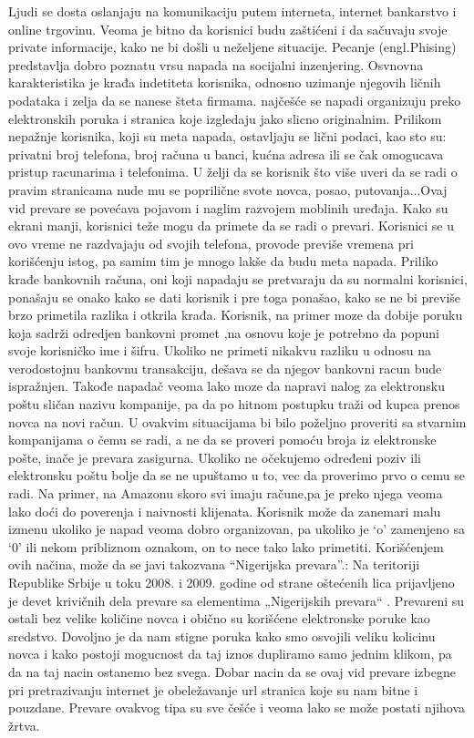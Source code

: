\documentclass[a4paper]{article}
\begin{document}
Ljudi se dosta oslanjaju na komunikaciju putem interneta, internet bankarstvo i	online trgovinu. Veoma je bitno da korisnici budu zaštićeni i da sačuvaju svoje private informacije, kako ne bi došli u neželjene situacije. Pecanje (engl.Phising) predstavlja dobro poznatu vrsu napada na socijalni inzenjering. Osvnovna karakteristika je krađa indetiteta korisnika, odnosno uzimanje njegovih ličnih podataka i zelja da se nanese šteta firmama. najčešće se napadi organizuju preko elektronskih poruka i stranica koje izgledaju jako slicno originalnim. Prilikom nepažnje korisnika, koji su meta napada, ostavljaju se lični podaci, kao sto su:  privatni broj telefona, broj računa u banci, kućna adresa ili se čak  omogucava pristup racunarima i telefonima. U želji da se korisnik što više uveri da se radi o pravim stranicama nude mu se poprilične svote novca, posao, putovanja...Ovaj vid prevare se povećava pojavom i naglim razvojem moblinih uređaja. Kako su ekrani manji, korisnici teže mogu da primete da se radi o prevari. Korisnici se u ovo vreme ne razdvajaju od svojih telefona, provode previše vremena pri korišćenju istog, pa samim tim je mnogo lakše da budu meta napada. Priliko krađe bankovnih računa, oni koji napadaju se pretvaraju da su normalni korisnici, ponašaju se onako kako se dati korisnik i pre toga ponašao, kako se ne bi previše brzo primetila razlika i otkrila krađa. 
Korisnik, na primer moze da dobije poruku  koja sadrži odredjen bankovni promet ,na osnovu koje je potrebno da popuni svoje korisničko ime i šifru. Ukoliko ne primeti nikakvu razliku u odnosu na verodostojnu bankovnu transakciju, dešava se da njegov bankovni racun bude ispražnjen. Takođe napadač veoma lako moze da napravi nalog za elektronsku poštu sličan nazivu kompanije, pa da po hitnom postupku traži od kupca prenos novca na novi račun. U ovakvim situacijama bi bilo poželjno proveriti sa stvarnim kompanijama o čemu se radi, a ne da se proveri pomoću broja iz elektronske pošte, inače je prevara zasigurna. Ukoliko ne očekujemo određeni poziv ili elektronsku poštu bolje da se ne upuštamo u to, vec da proverimo prvo o cemu se radi.
Na primer, na Amazonu skoro svi imaju račune,pa je preko njega veoma lako doći do poverenja i naivnosti klijenata. Korisnik može da zanemari malu izmenu ukoliko je napad veoma dobro organizovan, pa ukoliko je ‘o’ zamenjeno sa ‘0’  ili nekom pribliznom oznakom, on to nece tako lako primetiti. \cite{6exp} Korišćenjem ovih načina, može da se javi takozvana “Nigerijska prevara”.: Na teritoriji Republike Srbije u toku 2008. i 2009. godine od strane oštećenih lica prijavljeno je devet krivičnih dela prevare sa elementima „Nigerijskih prevara“ \cite{nig} . Prevareni su ostali bez velike količine novca i obično su korišćene elektronske poruke kao sredstvo. Dovoljno je da nam stigne poruka kako smo osvojili veliku kolicinu novca i kako postoji mogucnost da taj iznos dupliramo samo jednim klikom, pa da na taj nacin ostanemo bez svega. 
Dobar nacin da se ovaj vid prevare izbegne pri pretrazivanju internet je obeležavanje url stranica koje su nam bitne  i pouzdane. Prevare ovakvog tipa su sve češće i veoma lako se može postati njihova žrtva.
\end{document}
